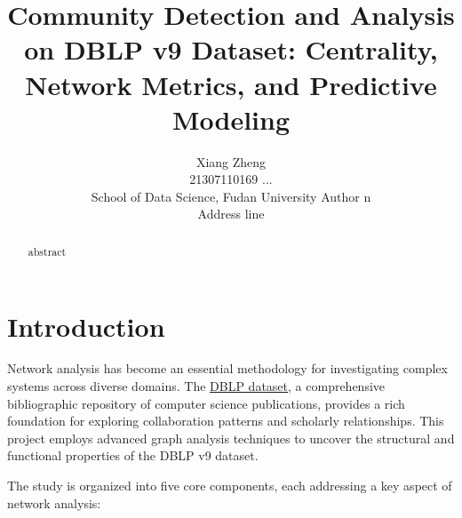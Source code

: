 \documentclass[11pt]{article}
\title{Community Detection and Analysis on DBLP v9 Dataset: Centrality, Network Metrics, and Predictive Modeling}
\author{
  Xiang Zheng \\ 21307110169 \And  
  ... 
  \vspace{0.7cm} \\ %
  \hfill School of Data Science, Fudan University \hfill
  \And
  Author n \\ Address line
}
\begin{document}
\maketitle
\begin{abstract}
	abstract
\end{abstract}

\section{Introduction}

Network analysis has become an essential methodology for investigating complex systems across diverse domains. The \href{https://www.aminer.cn/citation}{DBLP dataset}, a comprehensive bibliographic repository of computer science publications, provides a rich foundation for exploring collaboration patterns and scholarly relationships. This project employs advanced graph analysis techniques to uncover the structural and functional properties of the DBLP v9 dataset.

The study is organized into five core components, each addressing a key aspect of network analysis:
\end{document}
